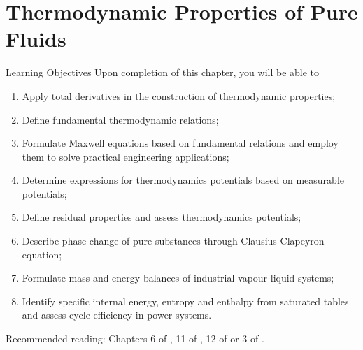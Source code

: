\chapter{Thermodynamic Properties of Pure Fluids}\label{Chapter:ThermodynamicPropertiesPureFluids}

   \begin{LearningObjectivesBlock}{Learning Objectives}
      Upon completion of this chapter, you will be able to
        \begin{enumerate}
           \item Apply total derivatives in the construction of thermodynamic properties;
           \item Define fundamental thermodynamic relations;
           \item Formulate Maxwell equations based on fundamental relations and employ them to solve practical engineering applications;
           \item Determine expressions for thermodynamics potentials based on measurable potentials;
           \item Define residual properties and assess thermodynamics potentials;
           \item Describe phase change of pure substances through Clausius-Clapeyron equation;
           \item Formulate mass and energy balances of industrial vapour-liquid systems;
           \item Identify specific internal energy, entropy and enthalpy from saturated tables and assess cycle efficiency in power systems.
        \end{enumerate}
\medskip
     Recommended reading: Chapters 6 of \citet{SmithVanNess_Book}, 11 of \citet{Balmer_Book}, 12 of \citet{Borgnakke_Book} or 3 of \citet{Atkins_Book}.
   \end{LearningObjectivesBlock}


\begin{comment}
   \begin{LearningObjectivesBlock}{Learning Objectives}
      Upon completion of this chapter, you will be able to
        \begin{enumerate}
           \item {\bf Knowledge:} Define, Name, Select, State 
           \item {\bf Comprehension:} Describe, Identify, Discuss
           \item {\bf Application:} Apply, Demonstrate, Employ, Sketch
           \item {\bf Analysis:} Analyse, Compare, Calculate, Solve
           \item {\bf Synthesis:} Determine, Formulate
           \item {\bf Evaluation:} Assess, Check, Estimate, Compare, Measure, Monitor
        \end{enumerate}
\end{comment}

